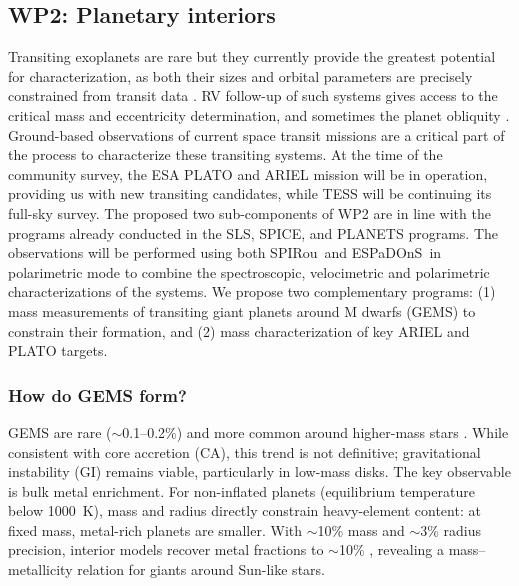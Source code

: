 \documentclass[
    traditabstract,
    longauth,
    onecolumn,
]{aa}
\def \spi{SPIRou}
\def \esp{ESPaDOnS}
\begin{document}
\subsection{WP2: Planetary interiors}
Transiting exoplanets are rare but they currently provide the greatest potential for characterization, as both their sizes and orbital parameters are precisely constrained from transit data \citep[e.g.,][]{cadieux_toi-1452_2022,kiefer_sub-neptube_2023}. RV follow-up of such systems gives access to the critical mass and eccentricity determination, and sometimes the planet obliquity \citep{martioli_spin-orbit_2020}. Ground-based observations of current space transit missions are a critical part of the process to characterize these transiting systems. At the time of the community survey, the ESA PLATO and ARIEL mission will be in operation, providing us with new transiting candidates, while TESS will be continuing its full-sky survey. %
The proposed two sub-components of WP2 are in line with the programs already conducted in the SLS, SPICE, and PLANETS programs. The observations will be performed using both \spi\ and \esp\ in polarimetric mode to combine the spectroscopic, velocimetric and polarimetric characterizations of the systems. We propose two complementary programs: (1) mass measurements of transiting giant planets around M dwarfs (GEMS) to constrain their formation, and (2) mass characterization of key ARIEL and PLATO targets.%



\subsubsection{How do GEMS form?}
GEMS are rare ($\sim$0.1--0.2\%) and more common around higher-mass stars \citep{bryant_occurrence_2023,glusman_searching_2026}. While consistent with core accretion (CA), this trend is not definitive; gravitational instability (GI) remains viable, particularly in low-mass disks. The key observable is bulk metal enrichment. For non-inflated planets (equilibrium temperature below 1000~K), mass and radius directly constrain heavy-element content: at fixed mass, metal-rich planets are smaller. With $\sim$10\% mass and $\sim$3\% radius precision, interior models recover metal fractions to $\sim$10\% \citep{Thorngren2016}, revealing a mass--metallicity relation for giants around Sun-like stars.
\end{document}
